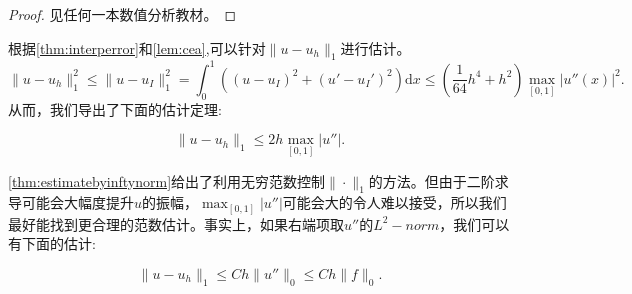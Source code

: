 \documentclass[lang=cn,10pt,newtx]{elegantbook}
\newcommand{\dif}{\mathrm{d}}
\newcommand{\norm}[1]{\|#1\|}
\begin{document}
\begin{proof}
  见任何一本数值分析教材。
\end{proof}
根据\ref{thm:interperror}和\ref{lem:cea},可以针对$\norm{u-u_{h}}_{1}$进行估计。
\begin{equation}
  \label{eq:ceaestimate}
  \norm{u-u_{h}}_{1}^{2}\le\norm{u-u_{I}}_{1}^{2}=\int_{0}^{1}((u-u_{I})^{2}+(u'-u_{I}')^{2})\dif x\le(\frac{1}{64}h^{4}+h^{2})\max_{[0,1]}|u''(x)|^{2}.
\end{equation}
从而，我们导出了下面的估计定理:
\begin{theorem}
  \label{thm:estimatebyinftynorm}
  \begin{equation}
    \norm{u-u_{h}}_{1}\le 2h\max_{[0,1]}|u''|.
  \end{equation}
\end{theorem}
\ref{thm:estimatebyinftynorm}给出了利用无穷范数控制$\norm{\cdot}_{1}$的方法。但由于二阶求导可能会大幅度提升$u$的振幅，$\max_{[0,1]}|u''|$可能会大的令人难以接受，所以我们最好能找到更合理的范数估计。事实上，如果右端项取$u''$的$L^{2}-norm$，我们可以有下面的估计:
\begin{theorem}
  \label{thm:estimatebyL2}
  \begin{equation}
    \norm{u-u_{h}}_{1}\le Ch\norm{u''}_{0}\le Ch\norm{f}_{0}.
  \end{equation}
\end{theorem}
\end{document}
